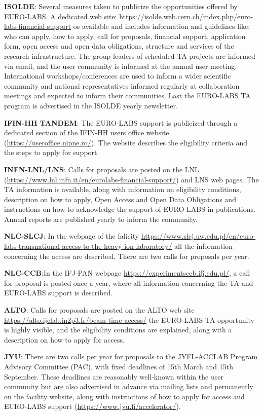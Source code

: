 \textbf{ISOLDE}: Several measures taken to publicize the opportunities offered by EURO-LABS. A dedicated web site: \url{https://isolde.web.cern.ch/index.php/euro-labs-financial-support} os available and includes information and guidelines like: who can apply, how to apply, call for proposals, financial support, application form, open access and open data obligations, structure and services of the research infrastructure. The group leaders of scheduled TA projects are informed via email, and the user community is informed at the annual user meeting. International workshops/conferences are used to inform a wider scientific community and national representatives informed regularly at collaboration meetings and expected to inform their communities. Last the EURO-LABS TA program is advertised in the ISOLDE yearly newsletter.

\textbf{IFIN-HH TANDEM}: The EURO-LABS support is publicized through a dedicated section of the IFIN-HH users office website (\url{https://useroffice.nipne.ro/}). The website describes the eligibility criteria and the steps to apply for support.

\textbf{INFN-LNL/LNS}: Calls for proposals are posted on the LNL (\url{https://www.lnl.infn.it/en/eurolabs-financial-support/}) and LNS web pages. The TA information is available, along with information on eligibility conditions, description on how to apply, Open Access and Open Data Obligations and instructions on how to acknowledge the support of EURO-LABS in publications. Annual reports are published yearly to inform the community.

\textbf{NLC-SLCJ}: In the webpage of the falicity \url{https://www.slcj.uw.edu.pl/en/euro-labs-transnational-access-to-the-heavy-ion-laboratory/} all the information concerning the access are described. There are two calls for proposals per year.

\textbf{NLC-CCB}:In the IFJ-PAN webpage \url{https://experimentsccb.ifj.edu.pl/}, a call for proposal is posted once a year, where all information concerning the TA and EURO-LABS support is described.

\textbf{ALTO}: Calls for proposals are posted on the ALTO web site \url{https://alto.ijclab.in2p3.fr/beam-time-access/} the EURO-LABS TA opportunity is highly visible, and the eligibility conditions are explained, along with a description on how to apply for access.

\textbf{JYU}: There are two calls per year for proposals to the JYFL-ACCLAB Program Advisory Committee (PAC), with fixed deadlines of 15th March and 15th September. These deadlines are reasonably well-known within the user community but are also advertised in advance via mailing lists and permanently on the facility website, along with instructions of how to apply for access and EURO-LABS support (\url{https://www.jyu.fi/accelerator/}).

